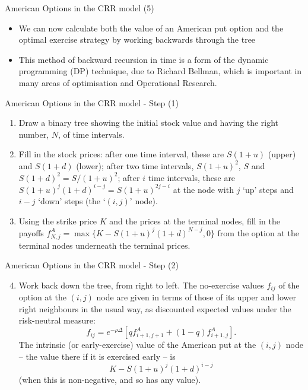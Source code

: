 { American Options in the CRR model (5)}

\begin{itemize}
  \item We can now calculate both the value of an American put option and
the optimal exercise strategy by working backwards through the
tree
 \item This method of backward recursion in time is a form of the
dynamic programming (DP) technique, \label{dynamic programming}
due to Richard Bellman, which is important in many areas of
optimisation and Operational Research.
\end{itemize}




{American Options in the CRR model - Step (1)}


\begin{enumerate}
  \item  Draw a binary
tree showing the initial stock value and having the
right number, $N$, of time intervals.
  \item  Fill in the stock prices: after one time interval, these are
$S(1+u)$ (upper) and $S(1+d)$ (lower); after two time intervals,
$S(1+u)^2$, $S$ and $ S(1+d)^2 = S/(1+u)^2$; after $i$ time
intervals, these are $S(1+u)^j (1+d)^{i-j} = S (1+u)^{2j- i}$ at
the node with
$j$ `up' steps and $i-j$ `down' steps (the `$(i,j)$' node).
  \item  Using the strike price $K$ and the prices at the terminal
nodes, fill in the payoffs $f^A_{N,j} = \max\{K - S (1+u)^j
(1+d)^{N-j}, 0\}$ from the option
at the terminal nodes underneath the terminal prices.
\end{enumerate}



{American Options in the CRR model - Step (2)}
\begin{enumerate}
\setcounter{enumi}{3}
\item  Work back down the tree, from right to left. The no-exercise
values $f_{ij}$ of the option at the $(i,j)$ node are given in
terms of those of its upper and lower right neighbours in the
usual way, as discounted expected values under the risk-neutral
measure:
$$
f_{ij} = e^{-\rho \Delta } [q f^A_{i+1,j+1} + (1 - q)
f^A_{i+1,j}].
$$
The intrinsic (or early-exercise) value of the American put at the
$(i,j)$
 node -- the value there if it is exercised early -- is
$$
K - S (1+u)^j (1+d)^{i-j}
$$
(when this is non-negative, and so has any value).
\end{enumerate}



